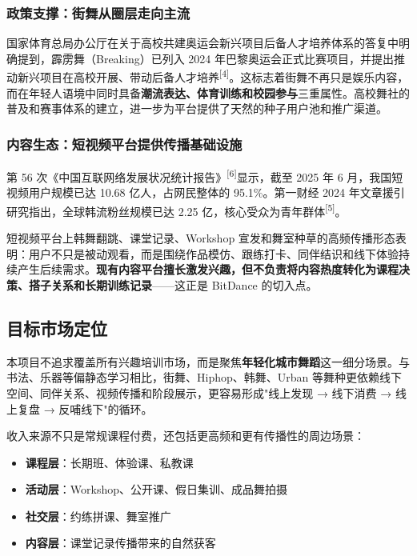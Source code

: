 \documentclass[12pt,a4paper]{ctexart}
\begin{document}
\subsubsection{政策支撑：街舞从圈层走向主流}

国家体育总局办公厅在关于高校共建奥运会新兴项目后备人才培养体系的答复中明确提到，霹雳舞（Breaking）已列入 2024 年巴黎奥运会正式比赛项目，并提出推动新兴项目在高校开展、带动后备人才培养\textsuperscript{[4]}。这标志着街舞不再只是娱乐内容，而在年轻人语境中同时具备\textbf{潮流表达、体育训练和校园参与}三重属性。高校舞社的普及和赛事体系的建立，进一步为平台提供了天然的种子用户池和推广渠道。

\subsubsection{内容生态：短视频平台提供传播基础设施}

第 56 次《中国互联网络发展状况统计报告》\textsuperscript{[6]}显示，截至 2025 年 6 月，我国短视频用户规模已达 10.68 亿人，占网民整体的 95.1\%。第一财经 2024 年文章援引研究指出，全球韩流粉丝规模已达 2.25 亿，核心受众为青年群体\textsuperscript{[5]}。

短视频平台上韩舞翻跳、课堂记录、Workshop 宣发和舞室种草的高频传播形态表明：用户不只是被动观看，而是围绕作品模仿、跟练打卡、同伴结识和线下体验持续产生后续需求。\textbf{现有内容平台擅长激发兴趣，但不负责将内容热度转化为课程决策、搭子关系和长期训练记录}——这正是 BitDance 的切入点。

\subsection{目标市场定位}

本项目不追求覆盖所有兴趣培训市场，而是聚焦\textbf{年轻化城市舞蹈}这一细分场景。与书法、乐器等偏静态学习相比，街舞、Hiphop、韩舞、Urban 等舞种更依赖线下空间、同伴关系、视频传播和阶段展示，更容易形成"线上发现 → 线下消费 → 线上复盘 → 反哺线下"的循环。

收入来源不只是常规课程付费，还包括更高频和更有传播性的周边场景：

\begin{itemize}
    \item \textbf{课程层}：长期班、体验课、私教课
    \item \textbf{活动层}：Workshop、公开课、假日集训、成品舞拍摄
    \item \textbf{社交层}：约练拼课、舞室推广
    \item \textbf{内容层}：课堂记录传播带来的自然获客
\end{itemize}
\end{document}
